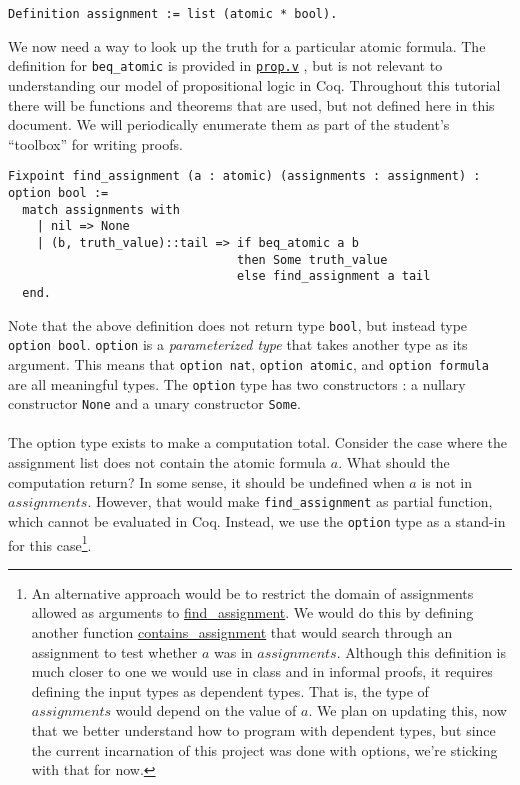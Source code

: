 \documentclass{article}
\newcommand{\link}[3]{%
    \underline{\texttt{\href{#1:#2}{#3}}}%
}
\begin{document}
\begin{lstlisting}
Definition assignment := list (atomic * bool).
\end{lstlisting}

We now need a way to look up the truth for a particular atomic formula. The definition for \verb|beq_atomic| is provided in \link{run}{prop.v}{prop.v}, but is not relevant to understanding our model of propositional logic in Coq. Throughout this tutorial there will be functions and theorems that are used, but not defined here in this document. We will periodically enumerate them as part of the student's ``toolbox'' for writing proofs.

\begin{lstlisting}
Fixpoint find_assignment (a : atomic) (assignments : assignment) : option bool :=
  match assignments with
    | nil => None
    | (b, truth_value)::tail => if beq_atomic a b
                                then Some truth_value
                                else find_assignment a tail
  end.
\end{lstlisting}

Note that the above definition does not return type \verb|bool|, but instead type \verb|option bool|. \verb|option| is a \emph{parameterized type} that takes another type as its argument. This means that \verb|option nat|, \verb|option atomic|, and \verb|option formula| are all meaningful types. The \verb|option| type has two constructors : a nullary constructor \verb|None| and a unary constructor \verb|Some|. 
\paragraph{}
The option type exists to make a computation total. Consider the case where the assignment list does not contain the atomic formula $a$. What should the computation return? In some sense, it should be undefined when $a$ is not in $assignments$. However, that would make \verb|find_assignment| as partial function, which cannot be evaluated in Coq. Instead, we use the \verb|option| type as a stand-in for this case\footnote{An alternative approach would be to restrict the domain of assignments allowed as arguments to \url{find_assignment}. We would do this by defining another function \url{contains_assignment} that would search through an assignment to test whether $a$ was in $assignments$. Although this definition is much closer to one we would use in class and in informal proofs, it requires defining the input types as dependent types. That is, the type of $assignments$ would depend on the value of $a$. We plan on updating this, now that we better understand how to program with dependent types, but since the current incarnation of this project was done with options, we're sticking with that for now.}.
\end{document}
